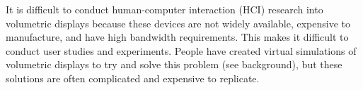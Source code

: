 \begin{tcbraster}[raster columns=2,raster equal height=rows]
\hfill
{}
\end{tcbraster}

It is difficult to conduct human-computer interaction (HCI) research into volumetric displays because these devices are not widely available, expensive to manufacture, and have high bandwidth requirements. This makes it difficult to conduct user studies and experiments. People have created virtual simulations of volumetric displays to try and solve this problem (see background), but these solutions are often complicated and expensive to replicate.

